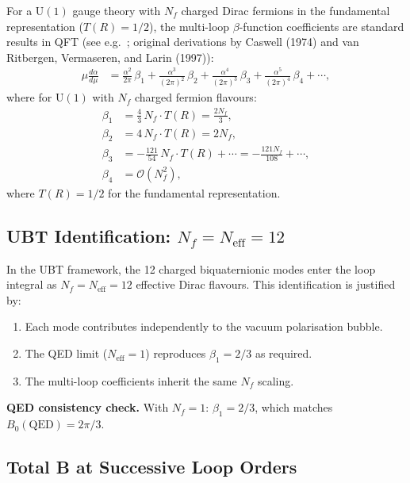 \documentclass[11pt,a4paper]{article}
\theoremstyle{remark}
\begin{document}
For a $\mathrm{U}(1)$ gauge theory with $N_f$ charged Dirac fermions in the fundamental
representation ($T(R) = 1/2$), the multi-loop $\beta$-function coefficients are standard
results in QFT (see e.g.\ \cite{Peskin1995}; original derivations by Caswell (1974) and
van Ritbergen, Vermaseren, and Larin (1997)):
\begin{align}
  \mu \frac{d\alpha}{d\mu} &= \frac{\alpha^2}{2\pi}\,\beta_1
    + \frac{\alpha^3}{(2\pi)^2}\,\beta_2
    + \frac{\alpha^4}{(2\pi)^3}\,\beta_3
    + \frac{\alpha^5}{(2\pi)^4}\,\beta_4 + \cdots,
  \label{eq:beta_function}
\end{align}
where for $\mathrm{U}(1)$ with $N_f$ charged fermion flavours:
\begin{align}
  \beta_1 &= \frac{4}{3}\,N_f \cdot T(R) = \frac{2N_f}{3}, \label{eq:beta1} \\
  \beta_2 &= 4\,N_f \cdot T(R) = 2N_f, \label{eq:beta2} \\
  \beta_3 &= -\frac{121}{54}\,N_f \cdot T(R) + \cdots = -\frac{121 N_f}{108} + \cdots, \label{eq:beta3} \\
  \beta_4 &= \mathcal{O}(N_f^2), \label{eq:beta4}
\end{align}
where $T(R) = 1/2$ for the fundamental representation.

\subsection{UBT Identification: \texorpdfstring{$N_f = N_{\mathrm{eff}} = 12$}{Nf = Neff = 12}}

In the UBT framework, the 12 charged biquaternionic modes enter the loop integral as $N_f = N_{\mathrm{eff}} = 12$ effective Dirac flavours. This identification is justified by:
\begin{enumerate}
  \item Each mode contributes independently to the vacuum polarisation bubble.
  \item The QED limit ($N_{\mathrm{eff}} = 1$) reproduces $\beta_1 = 2/3$ as required.
  \item The multi-loop coefficients inherit the same $N_f$ scaling.
\end{enumerate}

\textbf{QED consistency check.} With $N_f = 1$: $\beta_1 = 2/3$, which matches
$B_0(\mathrm{QED}) = 2\pi/3$. \checkmark

\subsection{Total B at Successive Loop Orders}
\end{document}
